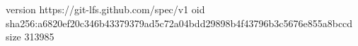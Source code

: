 version https://git-lfs.github.com/spec/v1
oid sha256:a6820ef20c346b43379379ad5c72a04bdd29898b4f43796b3c5676e855a8bccd
size 313985
